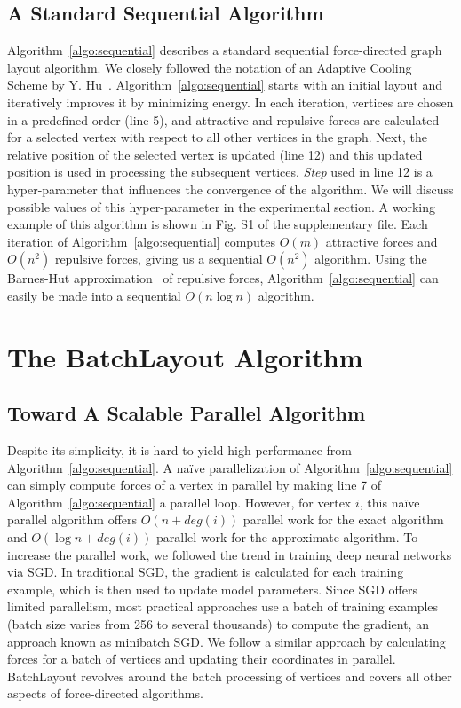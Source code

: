\documentclass{vgtc}
\newcommand{\toolname}{{BatchLayout}}
\begin{document}
\subsection{A Standard Sequential Algorithm}
Algorithm~\ref{algo:sequential} describes a standard sequential force-directed graph layout algorithm. 
We closely followed the notation of an Adaptive Cooling Scheme by Y. Hu~\cite{hu2005efficient}. 
Algorithm~\ref{algo:sequential} starts with an initial layout and iteratively improves it by minimizing energy.
In each iteration, vertices are chosen in a predefined order (line 5), and attractive and repulsive forces are calculated for a selected vertex with respect to all other vertices in the graph.
Next, the relative position of the selected vertex is updated (line 12) and this updated position is used in processing the subsequent vertices. 
\emph{Step} used in line 12 is a hyper-parameter that influences the convergence of the algorithm.  
We will discuss possible values of this hyper-parameter in the experimental section.
A working example of this algorithm is shown in Fig. S1 of the supplementary file. 
Each iteration of Algorithm~\ref{algo:sequential} computes $O(m)$ attractive forces and $O(n^2)$ repulsive forces, giving us a sequential $O(n^2)$ algorithm.
Using the Barnes-Hut approximation~\cite{barnes1986hierarchical} of repulsive forces, Algorithm~\ref{algo:sequential} can easily be made into a sequential $O(n\log n)$ algorithm. 

\section{The \toolname{} Algorithm}

\subsection{Toward A Scalable Parallel Algorithm}
Despite its simplicity, it is hard to yield high performance from Algorithm~\ref{algo:sequential}.
A na\"ive parallelization of Algorithm~\ref{algo:sequential} can simply compute forces of a vertex in parallel by making line 7 of Algorithm~\ref{algo:sequential} a parallel loop. 
However, for vertex $i$, this na\"ive parallel algorithm offers $O(n+deg(i))$ parallel work for the exact algorithm and $O(\log n+deg(i))$ parallel work for the approximate algorithm.
To increase the parallel work, we followed the trend in training deep neural networks via SGD.
In traditional SGD, the gradient is calculated for each training example, which is then used to update model parameters.
Since SGD offers limited parallelism, most practical approaches use a batch of training examples (batch size varies from 256 to several thousands) to compute the gradient, an approach known as minibatch SGD.
We follow a similar approach by calculating forces for a batch of vertices and updating their coordinates in parallel. 
\toolname{} revolves around the batch processing of vertices and covers all other aspects of force-directed algorithms. 
\end{document}
